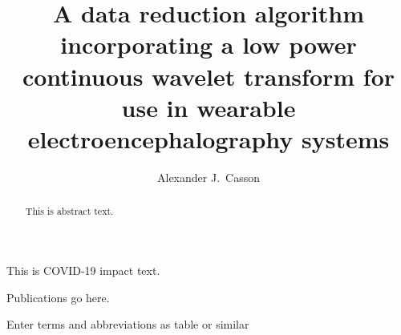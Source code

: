 \documentclass[times,thesis]{uom_thesis_casson} %
\begin{document}
\begin{uomcovid} %
  This is COVID-19 impact text.
  
  \lipsum[1-3] %
\end{uomcovid}%



\title{A data reduction algorithm incorporating a low power continuous wavelet transform for use in wearable electroencephalography systems}
\author{Alexander J.\ Casson}
\newcommand{\wordcount}{X}		                   %
\maketitle



\uomtoc %
\uomlof
\uomlot
\begin{uomlop} %
  Publications go here.
\end{uomlop}
\begin{uomterms}
  Enter terms and abbreviations as table or similar
\end{uomterms}



\begin{abstract} %
  This is abstract text. 
  
  \lipsum[1-2]
\end{abstract}%
\clearpage
\end{document}

